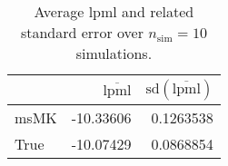 \begin{table}[H]

\caption{Average lpml and related standard error over $n_{\text{sim}} = 10$ simulations.}
\centering
\begin{tabular}[t]{lrr}
\toprule
  & $\overbar{\text{lpml}}$ & $\text{sd}(\overbar{\text{lpml}})$\\
\midrule
msMK & -10.33606 & 0.1263538\\
True & -10.07429 & 0.0868854\\
\bottomrule
\end{tabular}
\end{table}
